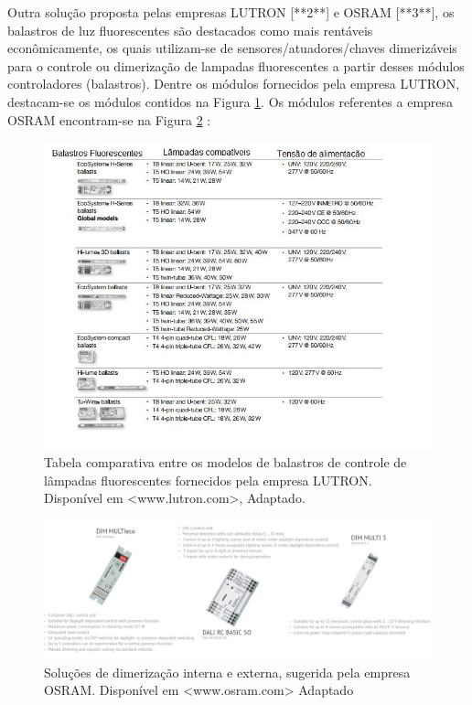 Outra solução proposta pelas empresas LUTRON [**2**] e OSRAM [**3**], os balastros de luz fluorescentes são destacados como mais rentáveis econômicamente, os quais utilizam-se de sensores/atuadores/chaves dimerizáveis para o controle ou dimerização de lampadas fluorescentes a partir desses módulos controladores (balastros). Dentre os módulos fornecidos pela empresa LUTRON, destacam-se os módulos contidos na Figura \ref{fig:tabelabalastros}.  Os módulos referentes a empresa OSRAM encontram-se na Figura \ref{fig:solucaodimerizacao} :
 
\begin{figure}[!h]
	\centering
	\includegraphics[width=1.0\textwidth]{figuras/tabelaBalastros.jpeg}
	\caption{Tabela comparativa entre os modelos de balastros de controle de lâmpadas fluorescentes fornecidos pela empresa LUTRON. Disponível em <www.lutron.com>, Adaptado.}
	\label{fig:tabelabalastros}
\end{figure}

\begin{figure}[!h]
	\centering
	\includegraphics[width=1.0\textwidth]{figuras/solucaoDimerizacao.jpeg}
	\caption{Soluções de dimerização interna e externa, sugerida pela empresa OSRAM. Disponível em <www.osram.com> Adaptado}
	\label{fig:solucaodimerizacao}
\end{figure}

